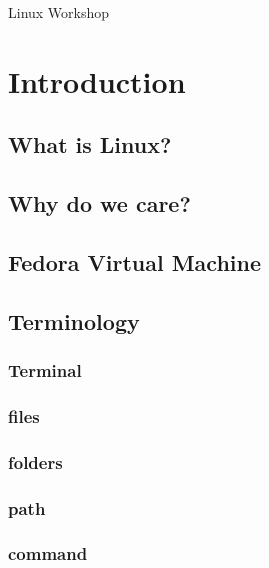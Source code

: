 \documentclass[11pt]{article}
\author{Ujjwal}
\date{\today}
\title{}
\begin{document}
\tableofcontents

Linux Workshop



\section{Introduction}
\label{sec:orgheadline12}


\subsection{What is Linux?}
\label{sec:orgheadline1}


\subsection{Why do we care?}
\label{sec:orgheadline2}


\subsection{Fedora Virtual Machine}
\label{sec:orgheadline3}


\subsection{Terminology}
\label{sec:orgheadline11}

\subsubsection{Terminal}
\label{sec:orgheadline4}

\subsubsection{files}
\label{sec:orgheadline5}

\subsubsection{folders}
\label{sec:orgheadline6}

\subsubsection{path}
\label{sec:orgheadline7}

\subsubsection{command}
\label{sec:orgheadline8}
\end{document}
